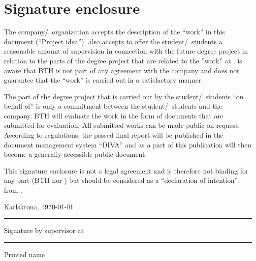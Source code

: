 \section{Signature enclosure}
The company/~organization \textit{\theCompany} accepts the description of the ``work'' in
this document (``Project idea'').
\textit{\theCompany} also accepts to offer
the student/~students a reasonable amount of supervision in connection with the future degree project in relation to the parts of the degree project that are related to the ”work” at \textit{\theCompany}.
\textit{\theCompany} is aware that BTH is not part of any agreement with the company and does not guarantee that the ``work'' is carried out in a satisfactory manner.

The part of the degree project that is carried out by the student/~students ``on behalf of''
\textit{\theCompany} is only a commitment between the student/~students and the company.
BTH will evaluate the work in the form of documents that are submitted for evaluation.
All submitted works can be made public on request. 
According to regulations, the passed final report will be published in the document management system ``DIVA'' and as a part of this publication will then become a generally accessible public document.

This signature enclosure is not a legal agreement and is therefore not binding for any part
(BTH nor \textit{\theCompany}) but should be considered as a ``declaration of intention''
from \textit{\theCompany}.

\vspace{12mm}
Karlskrona, \today
\vspace{12mm}

\rule{10cm}{1pt}

Signature by supervisor at \theCompany
\vspace{12mm}

\rule{10cm}{1pt}

Printed name

